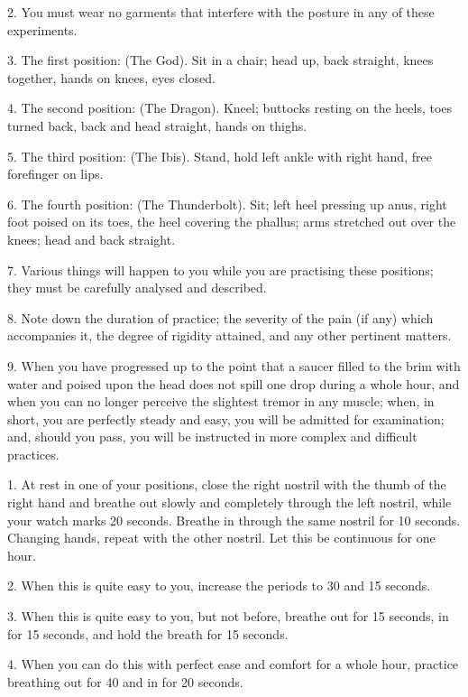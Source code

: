 2. You must wear no garments that interfere with the posture in any of these experiments.

3. The first position: (The God). Sit in a chair; head up, back straight, knees together, hands on knees, eyes closed.

4. The second position: (The Dragon). Kneel; buttocks resting on the heels, toes turned back, back and head straight, hands on thighs.

5. The third position: (The Ibis). Stand, hold left ankle with right hand, free forefinger on lips.

6. The fourth position: (The Thunderbolt). Sit; left heel pressing up anus, right foot poised on its toes, the heel covering the phallus; arms stretched out over the knees; head and back straight.

7. Various things will happen to you while you are practising these positions; they must be carefully analysed and described.

8. Note down the duration of practice; the severity of the pain (if any) which accompanies it, the degree of rigidity attained, and any other pertinent matters.

9. When you have progressed up to the point that a saucer filled to the brim with water and poised upon the head does not spill one drop during a whole hour, and when you can no longer perceive the slightest tremor in any muscle; when, in short, you are perfectly steady and easy, you will be admitted for examination; and, should you pass, you will be instructed in more complex and difficult practices.



1. At rest in one of your positions, close the right nostril with the thumb of the right hand and breathe out slowly and completely through the left nostril, while your watch marks 20 seconds. Breathe in through the same nostril for 10 seconds. Changing hands, repeat with the other nostril. Let this be continuous for one hour.

2. When this is quite easy to you, increase the periods to 30 and 15 seconds.

3. When this is quite easy to you, but not before, breathe out for 15 seconds, in for 15 seconds, and hold the breath for 15 seconds.

4. When you can do this with perfect ease and comfort for a whole hour, practice breathing out for 40 and in for 20 seconds.

